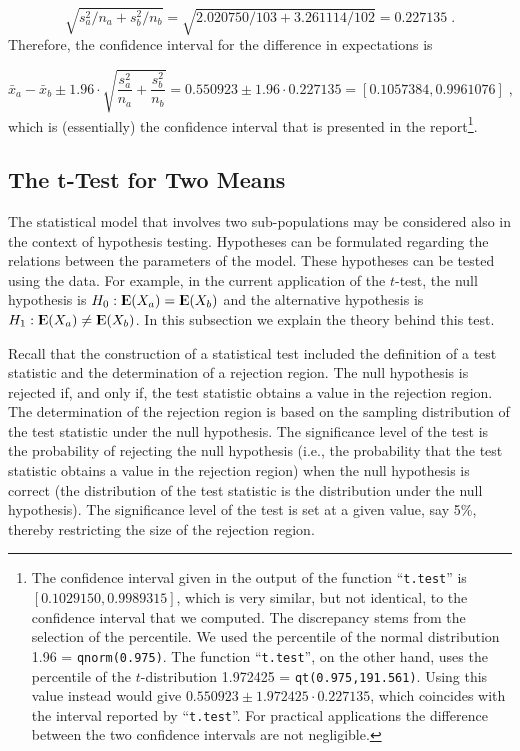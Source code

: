 \documentclass[]{krantz}
\newcommand{\Expec}{{\rm I\kern-.3em E}}
\theoremstyle{definition}
\theoremstyle{definition}
\theoremstyle{definition}
\theoremstyle{remark}
\begin{document}
\[\sqrt{s_a^2/n_a + s_b^2/n_b} = \sqrt{2.020750/103 + 3.261114/102} = 0.227135\;.\]
Therefore, the confidence interval for the difference in expectations is

\[\bar x_a- \bar x_b \pm 1.96 \cdot \sqrt{\frac{s_a^2}{n_a} + \frac{s_b^2}{n_b}} = 0.550923 \pm 1.96 \cdot 0.227135 = [0.1057384,0.9961076]\;,\]
which is (essentially) the confidence interval that is presented in the
report\footnote{The confidence interval given in the output of the
  function ``\texttt{t.test}'' is \([0.1029150, 0.9989315]\), which is
  very similar, but not identical, to the confidence interval that we
  computed. The discrepancy stems from the selection of the percentile.
  We used the percentile of the normal distribution 1.96 =
  \texttt{qnorm(0.975)}. The function ``\texttt{t.test}'', on the other
  hand, uses the percentile of the \(t\)-distribution 1.972425 =
  \texttt{qt(0.975,191.561)}. Using this value instead would give
  \(0.550923 \pm 1.972425 \cdot 0.227135\), which coincides with the
  interval reported by ``\texttt{t.test}''. For practical applications
  the difference between the two confidence intervals are not
  negligible.}.

\subsection{The t-Test for Two Means}\label{the-t-test-for-two-means}

The statistical model that involves two sub-populations may be
considered also in the context of hypothesis testing. Hypotheses can be
formulated regarding the relations between the parameters of the model.
These hypotheses can be tested using the data. For example, in the
current application of the \(t\)-test, the null hypothesis is
\(H_0: \Expec(X_a) = \Expec(X_b)\) and the alternative hypothesis is
\(H_1: \Expec(X_a) \not= \Expec(X_b)\). In this subsection we explain
the theory behind this test.

Recall that the construction of a statistical test included the
definition of a test statistic and the determination of a rejection
region. The null hypothesis is rejected if, and only if, the test
statistic obtains a value in the rejection region. The determination of
the rejection region is based on the sampling distribution of the test
statistic under the null hypothesis. The significance level of the test
is the probability of rejecting the null hypothesis (i.e., the
probability that the test statistic obtains a value in the rejection
region) when the null hypothesis is correct (the distribution of the
test statistic is the distribution under the null hypothesis). The
significance level of the test is set at a given value, say 5\%, thereby
restricting the size of the rejection region.
\end{document}
